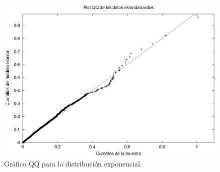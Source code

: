 \documentclass[a4paper,10pt]{article}
\begin{document}
\begin{figure}[ht]
\begin{center}
\includegraphics[width=12cm]{./qqplot_arribos.eps}
\caption{\label{fig:qq_arribos} Gráfico QQ para la distribución exponencial.}
\end{center}
\end{figure}

\end{document}
